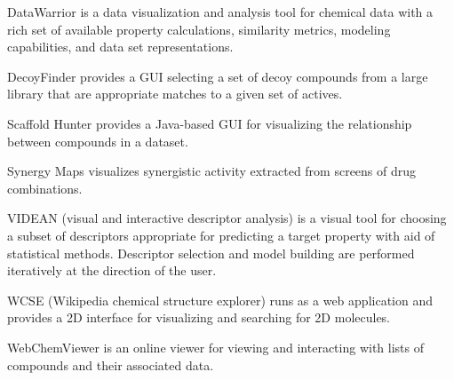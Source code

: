 DataWarrior \cite{Sander_2015} is a data visualization and analysis tool for chemical data with a rich set of available property calculations, similarity metrics, modeling capabilities, and data set representations.

DecoyFinder \cite{Cereto_Massague_2012} provides a GUI selecting a set of decoy compounds from a large library that are appropriate matches to a given set of actives.

 Scaffold Hunter \cite{Wetzel_2009} provides a Java-based GUI for visualizing the relationship between compounds in a dataset.

Synergy Maps \cite{Lewis_2015} visualizes synergistic activity extracted from screens of drug combinations. 

VIDEAN (visual and interactive descriptor analysis) \cite{Mart_nez_2015} is a visual tool for choosing a subset of descriptors appropriate for predicting a target property with aid of statistical methods.  Descriptor selection and model building are performed iteratively at the direction of the user.

WCSE (Wikipedia chemical structure explorer) \cite{Ertl_2015} runs as a web application and provides a 2D interface for visualizing and searching for 2D molecules.

WebChemViewer  \cite{Durrant_2014} is an online viewer for viewing and interacting with lists of compounds and their associated data.
